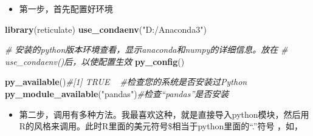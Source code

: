 \documentclass[
]{book}
\newenvironment{Shaded}{\begin{snugshade}}{\end{snugshade}}
\newcommand{\CommentTok}[1]{\textcolor[rgb]{0.56,0.35,0.01}{\textit{#1}}}
\newcommand{\DecValTok}[1]{\textcolor[rgb]{0.00,0.00,0.81}{#1}}
\newcommand{\KeywordTok}[1]{\textcolor[rgb]{0.13,0.29,0.53}{\textbf{#1}}}
\newcommand{\NormalTok}[1]{#1}
\newcommand{\OperatorTok}[1]{\textcolor[rgb]{0.81,0.36,0.00}{\textbf{#1}}}
\newcommand{\StringTok}[1]{\textcolor[rgb]{0.31,0.60,0.02}{#1}}
\providecommand{\tightlist}{%
  \setlength{\itemsep}{0pt}\setlength{\parskip}{0pt}}
\begin{document}
\begin{itemize}
\tightlist
\item
  第一步，首先配置好环境
\end{itemize}

\begin{Shaded}
\begin{Highlighting}[]
\KeywordTok{library}\NormalTok{(reticulate)}
\KeywordTok{use_condaenv}\NormalTok{(}\StringTok{"D:/Anaconda3"}\NormalTok{)}

\CommentTok{# 安装的python版本环境查看，显示anaconda和numpy的详细信息。放在}
\CommentTok{# use_condaenv()后，以使配置生效}
\KeywordTok{py_config}\NormalTok{()}

\KeywordTok{py_available}\NormalTok{()}\CommentTok{#[1] TRUE   #检查您的系统是否安装过Python}
\KeywordTok{py_module_available}\NormalTok{(}\StringTok{"pandas"}\NormalTok{)}\CommentTok{#检查“pandas”是否安装}
\end{Highlighting}
\end{Shaded}

\begin{itemize}
\tightlist
\item
  第二步，调用有多种方法。我最喜欢这种，就是直接导入python模块，然后用R的风格来调用。此时R里面的美元符号\$相当于python里面的``.''符号 ，如，
\end{itemize}

\begin{Shaded}
\end{Shaded}
\end{document}
